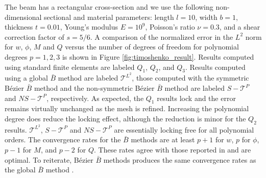 \documentclass{article}
\begin{document}
The beam has a rectangular cross-section and we use the following non-dimensional sectional and material parameters: length $l=10$, width $b=1$, thickness $t=0.01$, Young's modulus $E=10^9$, Poisson's ratio $\nu=0.3$, and a shear correction factor of $s=5/6$. A comparison of the normalized error in the $L^2$ norm for $w$, $\phi$, $M$ and $Q$ versus the number of degrees of freedom for polynomial degrees $p=1,2,3$ is shown in Figure \ref{fig:timoshenko_result}. Results computed using standard finite elements are labeled $Q_1$, $Q_2$, and $Q_3$. Results computed using a global $\bar{B}$ method are labeled $\mathcal{T}^{L^2}$, those computed with the symmetric B\'ezier $\bar{B}$ method and the non-symmetric B\'ezier $\bar{B}$ method are labeled $S-\mathcal{T}^{P}$ and $NS-\mathcal{T}^{P}$, respectively. As expected, the $Q_1$ results lock and the error remains virtually unchanged as the mesh is refined. Increasing the polynomial degree does reduce the locking effect, although the reduction is minor for the $Q_2$ results. $\mathcal{T}^{L^2}$, $S-\mathcal{T}^{P}$ and $NS-\mathcal{T}^P$ are essentially locking free for all polynomial orders. The convergence rates for the $\bar{B}$ methods are at least $p+1$ for $w$, $p$ for $\phi$, $p-1$ for $M$, and $p-2$ for $Q$. These rates agree with those reported in \cite{kiendl_single-variable_2015} and are optimal. To reiterate, B\'{e}zier $\bar{B}$ methods produces the same convergence rates as the global $\bar{B}$ method .
\end{document}
